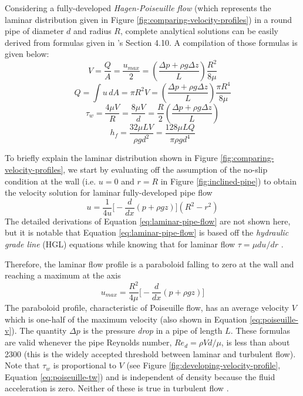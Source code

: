 \documentclass[9pt]{article} %
\numberwithin{equation}{section} %
\begin{document}
\begin{multicols}{2}
Considering a fully-developed \textit{Hagen-Poiseuille flow} (which represents the laminar distribution given in Figure \ref{fig:comparing-velocity-profiles}) in a round pipe of diameter $d$ and radius $R$, complete analytical solutions can be easily derived from formulas given in \textcite{fluid-mechanics}'s Section 4.10. A compilation of those formulas is given below:
\begin{equation} \label{eq:poiseuille-v}
V = \frac{Q}{A} = \frac{u_{max}}{2} = \left( \frac{\Delta p + \rho g \Delta z}{L} \right) \frac{R^{2}}{8 \mu}
\end{equation}
\begin{equation} \label{eq:poiseuille-q}
Q = \int u\, dA = \pi R^{2} V = \left( \frac{\Delta p + \rho g \Delta z}{L} \right) \frac{\pi R^{4}}{8 \mu}
\end{equation}
\begin{equation} \label{eq:poiseuille-tw}
\tau_{w} = \frac{4 \mu V}{R} = \frac{8 \mu V}{d} = \frac{R}{2} \left( \frac{\Delta p + \rho g \Delta z}{L} \right)
\end{equation}
\begin{equation}
h_{f} = \frac{32 \mu L V}{\rho g d^{2}} = \frac{128 \mu L Q}{\pi \rho g d^{4}}
\end{equation}


To briefly explain the laminar distribution shown in Figure \ref{fig:comparing-velocity-profiles}, we start by evaluating off the assumption of the no-slip condition at the wall (i.e. $u=0$ and $r=R$ in Figure \ref{fig:inclined-pipe}) to obtain the velocity solution for laminar fully-developed pipe flow
\begin{equation} \label{eq:laminar-pipe-flow}
u = \frac{1}{4 u} \big[ -\frac{d}{dx} (p + \rho g z) \big] (R^{2} - r^{2})
\end{equation}
The detailed derivations of Equation \ref{eq:laminar-pipe-flow} are not shown here, but it is notable that Equation \ref{eq:laminar-pipe-flow} is based off the \textit{hydraulic grade line} (HGL) equations while knowing that for laminar flow $\tau = \mu du/dr$ \cite{fluid-mechanics}.

Therefore, the laminar flow profile is a paraboloid falling to zero at the wall and reaching a maximum at the axis
\begin{equation}
u_{max} = \frac{R^{2}}{4 \mu} \big[  -\frac{d}{dx} (p + \rho g z) \big]
\end{equation}
The paraboloid profile, characteristic of Poiseuille flow, has an average velocity $V$ which is one-half of the maximum velocity (also shown in Equation \ref{eq:poiseuille-v}). The quantity $\Delta p$ is the pressure \textit{drop} in a pipe of length $L$. These formulas are valid whenever the pipe Reynolds number, $Re_{d} = \rho V d/\mu$, is less than about 2300 (this is the widely accepted threshold between laminar and turbulent flow). Note that $\tau_{w}$ is proportional to $V$ (see Figure \ref{fig:developing-velocity-profile}, Equation \ref{eq:poiseuille-tw}) and is independent of density because the fluid acceleration is zero. Neither of these is true in turbulent flow \cite{fluid-mechanics}.


\end{multicols}
\end{document}
